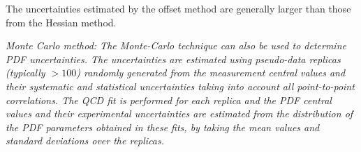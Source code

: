 \begin{description}
The uncertainties estimated by the offset method are generally larger than 
those from the Hessian method.
\\

\item \it{Monte Carlo method:} \rm
The Monte-Carlo technique \cite{Giele:1998gw, mcmethod2} can also be used to determine PDF uncertainties.
The uncertainties are estimated using pseudo-data replicas (typically $>100$) 
randomly generated from the measurement central values and their systematic and statistical uncertainties 
taking into account all point-to-point correlations.
%
The QCD fit is performed for each replica and the PDF central values and their 
experimental uncertainties are estimated from the distribution of the PDF parameters obtained in these fits, by taking 
the mean values and standard deviations over the replicas.
%


\end{description}
